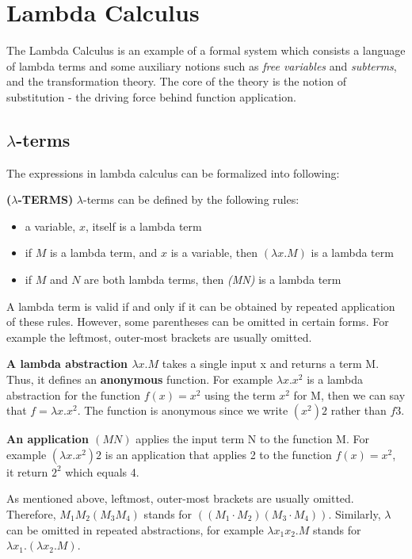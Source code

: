 \chapter{Lambda Calculus}

The Lambda Calculus is an example of a formal system which consists a language of lambda terms and some auxiliary notions such as \textit{free variables} and \textit{subterms}, and the transformation theory. The core of the theory is the notion of substitution - the driving force behind function application. 


\section{$\lambda$-terms}

\noindent The expressions in lambda calculus can be formalized into following: 


\begin{def1}
\normalfont \textbf{($\lambda$-TERMS)} $\lambda$-terms can be defined by the following rules:
\end{def1}

\begin{itemize}
\item a variable, $x$, itself is a lambda term
\item if $M$ is a lambda term, and $x$ is a variable, then $(\lambda x.M)$ is a lambda term
\item if $M$ and $N$ are both lambda terms, then \textit{(MN)} is a lambda term
\end{itemize}
A lambda term is valid if and only if it can be obtained by repeated application of these rules. However, some parentheses can be omitted in certain forms. For example the leftmost, outer-most brackets are usually omitted.

\textbf{A lambda abstraction $\lambda x.M$} takes a single input x and returns a term M. Thus, it defines an \textbf{anonymous} function. For example $\lambda x.x^2$ is a lambda abstraction for the function $f(x) = x^2$ using the term $x^2$ for M, then we can say that $f = \lambda x.x^2$. The function is anonymous since we write $(x^2)2$ rather than $f3$.

\textbf{An application $(MN)$} applies the input term N to the function M. For example $(\lambda x.x^2)2$ is an application that applies 2 to the function $f(x) = x^2$, it return $2^2$ which equals 4.

As mentioned above, leftmost, outer-most brackets are usually omitted. Therefore, $M_1M_2(M_3M_4)$ stands for $((M_1\cdot M_2)(M_3\cdot M_4))$. Similarly, $\lambda$ can be omitted in repeated abstractions, for example $\lambda x_1x_2.M$ stands for $\lambda x_1.(\lambda x_2.M)$.

